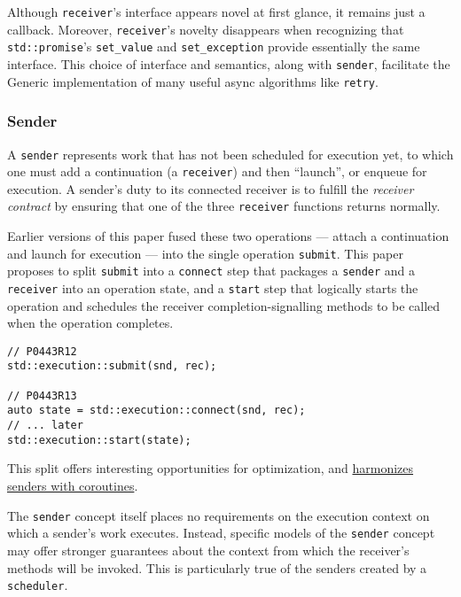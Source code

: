 \documentclass[a4paper,12pt,notitlepage,twoside,openright]{article}
\begin{document}
Although \texttt{receiver}'s interface appears novel at
first glance, it remains just a callback. Moreover,
\texttt{receiver}'s novelty disappears when recognizing that
\texttt{std::promise}'s \texttt{set_value} and
\texttt{set_exception} provide essentially the same
interface. This choice of interface and semantics, along with
\texttt{sender}, facilitate the Generic implementation of
many useful async algorithms like \texttt{retry}.

\hypertarget{sender}{%
\subsubsection{Sender}\label{sender}}

A \texttt{sender} represents work that has not been
scheduled for execution yet, to which one must add a continuation (a
\texttt{receiver}) and then ``launch'', or enqueue for
execution. A sender's duty to its connected receiver is to fulfill the
\emph{receiver contract} by ensuring that one of the three
\texttt{receiver} functions returns normally.

Earlier versions of this paper fused these two operations --- attach a
continuation and launch for execution --- into the single operation
\texttt{submit}. This paper proposes to split
\texttt{submit} into a \texttt{connect} step
that packages a \texttt{sender} and a
\texttt{receiver} into an operation state, and a
\texttt{start} step that logically starts the operation and
schedules the receiver completion-signalling methods to be called when
the operation completes.

\begin{verbatim}
// P0443R12
std::execution::submit(snd, rec);

// P0443R13
auto state = std::execution::connect(snd, rec);
// ... later
std::execution::start(state);
\end{verbatim}

This split offers interesting opportunities for optimization, and
\protect\hyperlink{appendix-a-note-on-coroutines}{harmonizes senders
with coroutines}.

The \texttt{sender} concept itself places no requirements on
the execution context on which a sender's work executes. Instead,
specific models of the \texttt{sender} concept may offer
stronger guarantees about the context from which the receiver's methods
will be invoked. This is particularly true of the senders created by a
\texttt{scheduler}.
\end{document}
